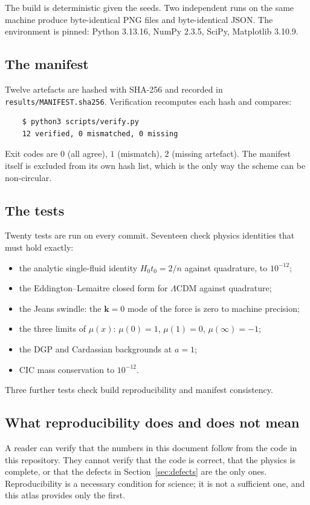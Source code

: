 \documentclass[11pt,a4paper]{article}
\theoremstyle{definition}
\newcommand{\Hzt}{H_0 t_0}
\begin{document}
The build is deterministic given the seeds. Two independent runs on the same
machine produce byte-identical PNG files and byte-identical JSON. The
environment is pinned: Python 3.13.16, NumPy 2.3.5, SciPy, Matplotlib 3.10.9.

\subsection{The manifest}

Twelve artefacts are hashed with SHA-256 and recorded in
\texttt{results/MANIFEST.sha256}. Verification recomputes each hash and
compares:
\begin{verbatim}
    $ python3 scripts/verify.py
    12 verified, 0 mismatched, 0 missing
\end{verbatim}
Exit codes are $0$ (all agree), $1$ (mismatch), $2$ (missing artefact). The
manifest itself is excluded from its own hash list, which is the only way the
scheme can be non-circular.

\subsection{The tests}

Twenty tests are run on every commit. Seventeen check physics identities that
must hold exactly:
\begin{itemize}
\item the analytic single-fluid identity $\Hzt = 2/n$ against quadrature, to
      $10^{-12}$;
\item the Eddington--Lemaitre closed form for $\Lambda$CDM against quadrature;
\item the Jeans swindle: the $\mathbf{k}=0$ mode of the force is zero to
      machine precision;
\item the three limits of $\mu(x)$: $\mu(0) = 1$, $\mu(1) = 0$,
      $\mu(\infty) = -1$;
\item the DGP and Cardassian backgrounds at $a = 1$;
\item CIC mass conservation to $10^{-12}$.
\end{itemize}
Three further tests check build reproducibility and manifest consistency.

\subsection{What reproducibility does and does not mean}

A reader can verify that the numbers in this document follow from the code in
this repository. They cannot verify that the code is correct, that the
physics is complete, or that the defects in Section~\ref{sec:defects} are the
only ones. Reproducibility is a necessary condition for science; it is not a
sufficient one, and this atlas provides only the first.
\end{document}
